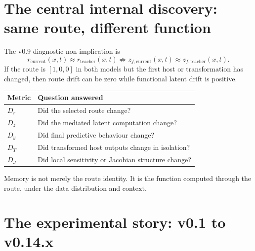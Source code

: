 \documentclass[11pt,a4paper]{article}
\newcommand{\tablehead}[1]{\cellcolor{DeepTeal}\color{white}\bfseries #1}
\begin{document}
\newpage
\section{The central internal discovery: same route, different function}

The v0.9 diagnostic non-implication is
\[
r_{\text{current}}(x,t)\approx r_{\text{teacher}}(x,t)
\not\Rightarrow
z_{f,\text{current}}(x,t)\approx z_{f,\text{teacher}}(x,t).
\]
If the route is $[1,0,0]$ in both models but the first host or transformation has changed, then route drift can be zero while functional latent drift is positive.

\begin{tabularx}{\textwidth}{p{2.2cm}X}
\toprule
\tablehead{Metric} & \tablehead{Question answered}\\
\midrule
$D_r$ & Did the selected route change?\\
$D_z$ & Did the mediated latent computation change?\\
$D_y$ & Did final predictive behaviour change?\\
$D_T$ & Did transformed host outputs change in isolation?\\
$D_J$ & Did local sensitivity or Jacobian structure change?\\
\bottomrule
\end{tabularx}

\begin{keybox}
Memory is not merely the route identity. It is the function computed through the route, under the data distribution and context.
\end{keybox}

\section{The experimental story: v0.1 to v0.14.x}
\end{document}

